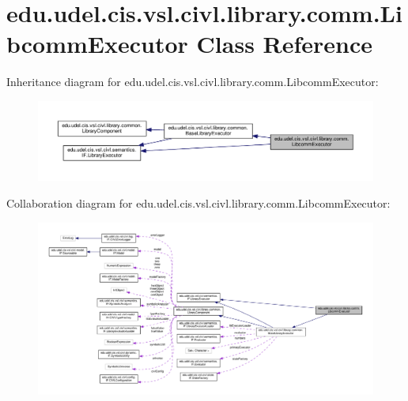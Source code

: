 \hypertarget{classedu_1_1udel_1_1cis_1_1vsl_1_1civl_1_1library_1_1comm_1_1LibcommExecutor}{}\section{edu.\+udel.\+cis.\+vsl.\+civl.\+library.\+comm.\+Libcomm\+Executor Class Reference}
\label{classedu_1_1udel_1_1cis_1_1vsl_1_1civl_1_1library_1_1comm_1_1LibcommExecutor}


Inheritance diagram for edu.\+udel.\+cis.\+vsl.\+civl.\+library.\+comm.\+Libcomm\+Executor\+:
\nopagebreak
\begin{figure}[H]
\begin{center}
\leavevmode
\includegraphics[width=350pt]{classedu_1_1udel_1_1cis_1_1vsl_1_1civl_1_1library_1_1comm_1_1LibcommExecutor__inherit__graph}
\end{center}
\end{figure}


Collaboration diagram for edu.\+udel.\+cis.\+vsl.\+civl.\+library.\+comm.\+Libcomm\+Executor\+:
\nopagebreak
\begin{figure}[H]
\begin{center}
\leavevmode
\includegraphics[width=350pt]{classedu_1_1udel_1_1cis_1_1vsl_1_1civl_1_1library_1_1comm_1_1LibcommExecutor__coll__graph}
\end{center}
\end{figure}
